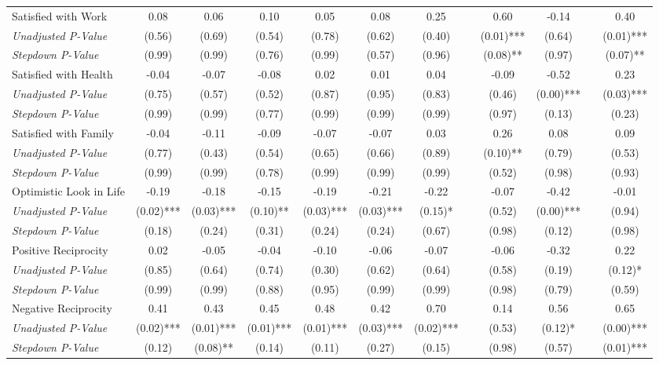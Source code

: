 \begin{tabular}{l c c c c c c c c c c c}
Satisfied with Work & 0.08 & 0.06 & 0.10 & 0.05 & 0.08 & 0.25 & & 0.60 & -0.14 & & 0.40 \\
\quad \textit{Unadjusted P-Value} & (0.56) & (0.69) & (0.54) & (0.78) & (0.62) & (0.40) & & (0.01)*** & (0.64) & & (0.01)*** \\
\quad \textit{Stepdown P-Value} & (0.99) & (0.99) & (0.76) & (0.99) & (0.57) & (0.96) & & (0.08)** & (0.97) & & (0.07)** \\
Satisfied with Health & -0.04 & -0.07 & -0.08 & 0.02 & 0.01 & 0.04 & & -0.09 & -0.52 & & 0.23 \\
\quad \textit{Unadjusted P-Value} & (0.75) & (0.57) & (0.52) & (0.87) & (0.95) & (0.83) & & (0.46) & (0.00)*** & & (0.03)*** \\
\quad \textit{Stepdown P-Value} & (0.99) & (0.99) & (0.77) & (0.99) & (0.99) & (0.99) & & (0.97) & (0.13) & & (0.23) \\
Satisfied with Family & -0.04 & -0.11 & -0.09 & -0.07 & -0.07 & 0.03 & & 0.26 & 0.08 & & 0.09 \\
\quad \textit{Unadjusted P-Value} & (0.77) & (0.43) & (0.54) & (0.65) & (0.66) & (0.89) & & (0.10)** & (0.79) & & (0.53) \\
\quad \textit{Stepdown P-Value} & (0.99) & (0.99) & (0.78) & (0.99) & (0.99) & (0.99) & & (0.52) & (0.98) & & (0.93) \\
Optimistic Look in Life & -0.19 & -0.18 & -0.15 & -0.19 & -0.21 & -0.22 & & -0.07 & -0.42 & & -0.01 \\
\quad \textit{Unadjusted P-Value} & (0.02)*** & (0.03)*** & (0.10)** & (0.03)*** & (0.03)*** & (0.15)* & & (0.52) & (0.00)*** & & (0.94) \\
\quad \textit{Stepdown P-Value} & (0.18) & (0.24) & (0.31) & (0.24) & (0.24) & (0.67) & & (0.98) & (0.12) & & (0.98) \\
Positive Reciprocity & 0.02 & -0.05 & -0.04 & -0.10 & -0.06 & -0.07 & & -0.06 & -0.32 & & 0.22 \\
\quad \textit{Unadjusted P-Value} & (0.85) & (0.64) & (0.74) & (0.30) & (0.62) & (0.64) & & (0.58) & (0.19) & & (0.12)* \\
\quad \textit{Stepdown P-Value} & (0.99) & (0.99) & (0.88) & (0.95) & (0.99) & (0.99) & & (0.98) & (0.79) & & (0.59) \\
Negative Reciprocity & 0.41 & 0.43 & 0.45 & 0.48 & 0.42 & 0.70 & & 0.14 & 0.56 & & 0.65 \\
\quad \textit{Unadjusted P-Value} & (0.02)*** & (0.01)*** & (0.01)*** & (0.01)*** & (0.03)*** & (0.02)*** & & (0.53) & (0.12)* & & (0.00)*** \\
\quad \textit{Stepdown P-Value} & (0.12) & (0.08)** & (0.14) & (0.11) & (0.27) & (0.15) & & (0.98) & (0.57) & & (0.01)*** \\
\bottomrule
\end{tabular}
